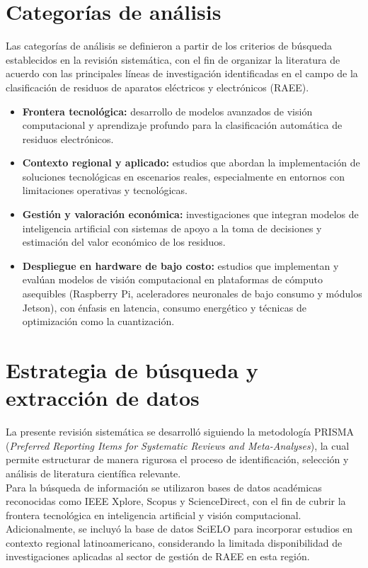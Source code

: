 \section{Categorías de análisis}

Las categorías de análisis se definieron a partir de los criterios de búsqueda establecidos en la revisión sistemática, con el fin de organizar la literatura de acuerdo con las principales líneas de investigación identificadas en el campo de la clasificación de residuos de aparatos eléctricos y electrónicos (RAEE).

\begin{itemize}
    \item \textbf{Frontera tecnológica:} desarrollo de modelos avanzados de visión computacional y aprendizaje profundo para la clasificación automática de residuos electrónicos.

    \item \textbf{Contexto regional y aplicado:} estudios que abordan la implementación de soluciones tecnológicas en escenarios reales, especialmente en entornos con limitaciones operativas y tecnológicas.

    \item \textbf{Gestión y valoración económica:} investigaciones que integran modelos de inteligencia artificial con sistemas de apoyo a la toma de decisiones y estimación del valor económico de los residuos.

    \item \textbf{Despliegue en hardware de bajo costo:} estudios que implementan y evalúan modelos de visión computacional en plataformas de cómputo asequibles (Raspberry Pi, aceleradores neuronales de bajo consumo y módulos Jetson), con énfasis en latencia, consumo energético y técnicas de optimización como la cuantización.
\end{itemize}

\section{Estrategia de búsqueda y extracción de datos}

La presente revisión sistemática se desarrolló siguiendo la metodología PRISMA (\textit{Preferred Reporting Items for Systematic Reviews and Meta-Analyses}), la cual permite estructurar de manera rigurosa el proceso de identificación, selección y análisis de literatura científica relevante.\\

Para la búsqueda de información se utilizaron bases de datos académicas reconocidas como IEEE Xplore, Scopus y ScienceDirect, con el fin de cubrir la frontera tecnológica en inteligencia artificial y visión computacional. Adicionalmente, se incluyó la base de datos SciELO para incorporar estudios en contexto regional latinoamericano, considerando la limitada disponibilidad de investigaciones aplicadas al sector de gestión de RAEE en esta región.\\

